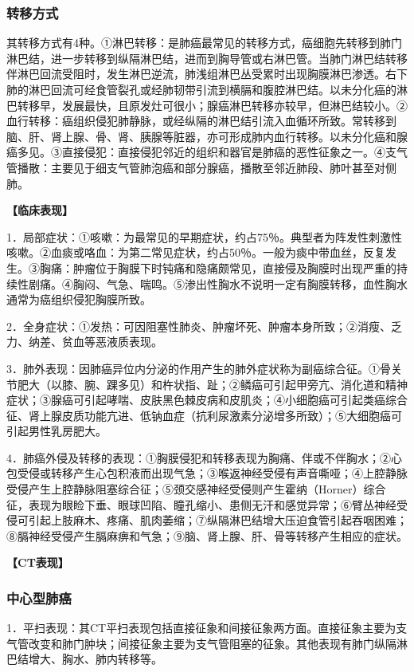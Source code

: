 \subsubsection{转移方式}

其转移方式有4种。①淋巴转移：是肺癌最常见的转移方式，癌细胞先转移到肺门淋巴结，进一步转移到纵隔淋巴结，进而到胸导管或右淋巴管。当肺门淋巴结转移伴淋巴回流受阻时，发生淋巴逆流，肺浅组淋巴丛受累时出现胸膜淋巴渗透。右下肺的淋巴回流可经食管裂孔或经肺韧带引流到横膈和腹腔淋巴结。以未分化癌的淋巴转移早，发展最快，且原发灶可很小；腺癌淋巴转移亦较早，但淋巴结较小。②血行转移：癌组织侵犯肺静脉，或经纵隔的淋巴结引流入血循环所致。常转移到脑、肝、肾上腺、骨、肾、胰腺等脏器，亦可形成肺内血行转移。以未分化癌和腺癌多见。③直接侵犯：直接侵犯邻近的组织和器官是肺癌的恶性征象之一。④支气管播散：主要见于细支气管肺泡癌和部分腺癌，播散至邻近肺段、肺叶甚至对侧肺。

\textbf{【临床表现】}

1．局部症状：①咳嗽：为最常见的早期症状，约占75％。典型者为阵发性刺激性咳嗽。②血痰或咯血：为第二常见症状，约占50％。一般为痰中带血丝，反复发生。③胸痛：肿瘤位于胸膜下时钝痛和隐痛颇常见，直接侵及胸膜时出现严重的持续性剧痛。④胸闷、气急、喘鸣。⑤渗出性胸水不说明一定有胸膜转移，血性胸水通常为癌组织侵犯胸膜所致。

2．全身症状：①发热：可因阻塞性肺炎、肿瘤坏死、肿瘤本身所致；②消瘦、乏力、纳差、贫血等恶液质表现。

3．肺外表现：因肺癌异位内分泌的作用产生的肺外症状称为副癌综合征。①骨关节肥大（以膝、腕、踝多见）和杵状指、趾；②鳞癌可引起甲旁亢、消化道和精神症状；③腺癌可引起哮喘、皮肤黑色棘皮病和皮肌炎；④小细胞癌可引起类癌综合征、肾上腺皮质功能亢进、低钠血症（抗利尿激素分泌增多所致）；⑤大细胞癌可引起男性乳房肥大。

4．肺癌外侵及转移的表现：①胸膜侵犯和转移表现为胸痛、伴或不伴胸水；②心包受侵或转移产生心包积液而出现气急；③喉返神经受侵有声音嘶哑；④上腔静脉受侵产生上腔静脉阻塞综合征；⑤颈交感神经受侵则产生霍纳（Horner）综合征，表现为眼睑下垂、眼球凹陷、瞳孔缩小、患侧无汗和感觉异常；⑥臂丛神经受侵可引起上肢麻木、疼痛、肌肉萎缩；⑦纵隔淋巴结增大压迫食管引起吞咽困难；⑧膈神经受侵产生膈麻痹和气急；⑨脑、肾上腺、肝、骨等转移产生相应的症状。

\textbf{【CT表现】}

\subsubsection{中心型肺癌}

1．平扫表现：其CT平扫表现包括直接征象和间接征象两方面。直接征象主要为支气管改变和肺门肿块；间接征象主要为支气管阻塞的征象。其他表现有肺门纵隔淋巴结增大、胸水、肺内转移等。

